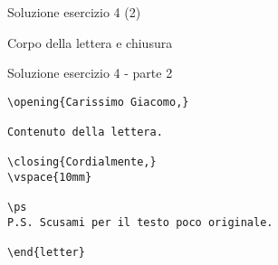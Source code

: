 \begin{frame}[fragile]{Soluzione esercizio 4 (2)}

Corpo della lettera e chiusura
\begin{soluzione}{Soluzione esercizio 4 - parte 2}
\begin{code}
\begin{verbatim}
\opening{Carissimo Giacomo,}

Contenuto della lettera.

\closing{Cordialmente,}
\vspace{10mm}

\ps
P.S. Scusami per il testo poco originale.

\end{letter}


\end{verbatim}
\end{code}
\end{soluzione}

\end{frame}